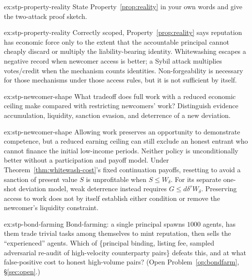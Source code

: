 \documentclass[11pt,a4paper]{article}
\theoremstyle{definition}
\begin{document}


\begin{pdexercise}[kind=Check,rating=1]{ex:stp-property-reality}
State Property~\ref{prop:reality} in your own words and give the two-attack
proof sketch.
\end{pdexercise}
\begin{pdsolution}{ex:stp-property-reality}
Correctly scoped, Property~\ref{prop:reality} says reputation has economic
force only to the extent that the accountable principal cannot cheaply
discard or multiply the liability-bearing identity. Whitewashing escapes a
negative record when newcomer access is better; a Sybil attack multiplies
votes/credit when the mechanism counts identities. Non-forgeability is
necessary for those mechanisms under those access rules, but it is not
sufficient by itself.
\end{pdsolution}
\begin{pdexercise}[kind=Trace,rating=2]{ex:stp-newcomer-shape}
What tradeoff does full work with a reduced economic ceiling make compared
with restricting newcomers' work? Distinguish evidence accumulation,
liquidity, sanction evasion, and deterrence of a new deviation.
\end{pdexercise}
\begin{pdsolution}{ex:stp-newcomer-shape}
Allowing work preserves an opportunity to demonstrate competence, but a
reduced earning ceiling can still exclude an honest entrant who cannot
finance the initial low-income periods. Neither policy is unconditionally
better without a participation and payoff model. Under
Theorem~\ref{thm:whitewash-cost}'s fixed continuation payoffs, resetting to
avoid a sanction of present value $S$ is unprofitable when $S\le W_\delta$.
For its separate one-shot deviation model, weak deterrence instead requires
$G\le d\delta^\tau W_\delta$. Preserving access to work does not by itself
establish either condition or remove the newcomer's liquidity constraint.
\end{pdsolution}
\begin{pdexercise}[kind=Open,rating=3]{ex:stp-bond-farming}
Bond-farming: a single principal spawns $1000$ agents, has them trade trivial
tasks among themselves to mint reputation, then sells the ``experienced''
agents. Which of \{principal binding, listing fee, sampled adversarial
re-audit of high-velocity counterparty pairs\} defeats this, and at what
false-positive cost to honest high-volume pairs? (Open
Problem~\ref{op:bondfarm}, \S\ref{sec:open}.)
\end{pdexercise}
\end{document}
